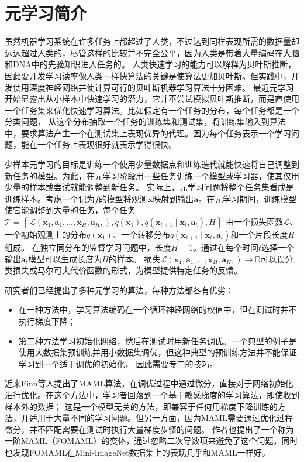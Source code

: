 \documentclass[11pt,twoside,a4paper]{ctexart}
\begin{document}
\section{元学习简介}
虽然机器学习系统在许多任务上都超过了人类，不过达到同样表现所需的数据量却远远超过人类的，尽管这样的比较并不完全公平，因为人类是带着大量编码在大脑和DNA中的先验知识进入任务的。
人类快速学习的能力可以解释为贝叶斯推断，因此要开发学习读率像人类一样快算法的关键是使算法更加贝叶斯。但实践中，开发使用深度神经网络并使计算可行的贝叶斯机器学习算法十分困难。
最近元学习开始显露出从小样本中快速学习的潜力，它并不尝试模拟贝叶斯推断，而是直使用一个任务集来优化快速学习算法。比如假定有一个任务的分布，每个任务都是一个分类问题，
从这个分布抽取一个任务的训练集和测试集，将训练集输入到算法中，要求算法产生一个在测试集上表现优异的代理。因为每个任务表示一个学习问题，能在一个任务上表现很好就表示学得很快。

少样本元学习的目标是训练一个使用少量数据点和训练迭代就能快速将自己调整到新任务的模型。为此，在元学习阶段用一些任务训练一个模型或学习器，使其仅用少量的样本或尝试就能调整到新任务。
实际上，元学习问题将整个任务集看成是训练样本。考虑一个记为$f$的模型将观测$\mathbf x$映射到输出$\mathbf a$。在元学习期间，训练模型使它能调整到大量的任务，每个任务
$\mathcal T=\left\{\mathcal L(\mathbf x_1, \mathbf a_1, \ldots, \mathbf x_H, \mathbf a_H, ), q(\mathbf x_1), q(\mathbf x_{t+1}\mid\mathbf x_t, \mathbf a_t), H\right\}$
由一个损失函数$\mathcal L$、一个初始观测上的分布$q(\mathbf x_1)$、一个转移分布$q(\mathbf x_{t+1}\mid \mathbf x_t,\mathbf a_t)$和一个片段长度$H$组成。
在独立同分布的监督学习问题中，长度$H=1$。通过在每个时间$t$选择一个输出$\mathbf a_t$模型可以生成长度为$H$的样本。
损失$\mathcal L(\mathbf x_1, \mathbf a_1, \ldots, \mathbf x_H, \mathbf a_H, ) \to \mathbb R$可以误分类损失或马尔可夫代价函数的形式，为模型提供特定任务的反馈。

研究者们已经提出了多种元学习的算法，每种方法都各有优劣：
\begin{itemize}
	\item 在一种方法中，学习算法编码在一个循环神经网络的权值中，但在测试时并不执行梯度下降；
	\item 第二种方法学习初始化网络，然后在测试时用新任务调优。一个典型的例子是使用大数据集预训练并用小数据集调优，但这种典型的预训练方法并不能保证学习到一个适于调优的初始化，
	因此需要专门的技巧。
\end{itemize}

近来Finn等人提出了MAML算法，在调优过程中通过微分，直接对于网络初始化进行优化。在这个方法中，学习者回落到一个基于敏感梯度的学习算法，即使收到样本外的数据；
这是一个模型无关的方法，即兼容于任何用梯度下降训练的方法，并适用于大量不同的学习问题。但另一方面，因为MAML需要通过优化过程微分，并不匹配需要在测试时执行大量梯度步骤的问题。
作者也提出了一个称为一阶MAML（FOMAML）的变体，通过忽略二次导数项来避免了这个问题，同时也发现FOMAML在Mini-ImageNet数据集上的表现几乎和MAML一样好。
\end{document}
